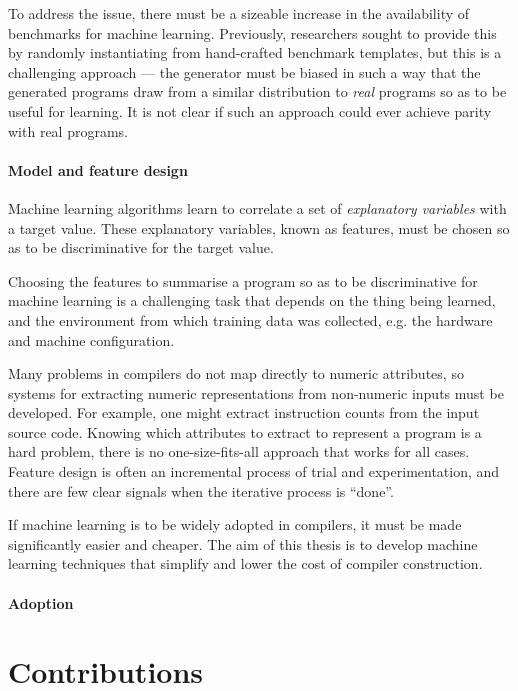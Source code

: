 To address the issue, there must be a sizeable increase in the availability of benchmarks for machine learning. Previously, researchers sought to provide this by randomly instantiating from hand-crafted benchmark templates, but this is a challenging approach --- the generator must be biased in such a way that the generated programs draw from a similar distribution to \emph{real} programs so as to be useful for learning. It is not clear if such an approach could ever achieve parity with real programs.

\paragraph*{Model and feature design} Machine learning algorithms learn to correlate a set of \emph{explanatory variables} with a target value. These explanatory variables, known as features, must be chosen so as to be discriminative for the target value.

Choosing the features to summarise a program so as to be discriminative for machine learning is a challenging task that depends on the thing being learned, and the environment from which training data was collected, e.g. the hardware and machine configuration.

Many problems in compilers do not map directly to numeric attributes, so systems for extracting numeric representations from non-numeric inputs must be developed. For example, one might extract instruction counts from the input source code. Knowing which attributes to extract to represent a program is a hard problem, there is no one-size-fits-all approach that works for all cases. Feature design is often an incremental process of trial and experimentation, and there are few clear signals when the iterative process is ``done''.

If machine learning is to be widely adopted in compilers, it must be made significantly easier and cheaper. The aim of this thesis is to develop machine learning techniques that simplify and lower the cost of compiler construction.

\paragraph*{Adoption}


\newpage
\section{Contributions}

